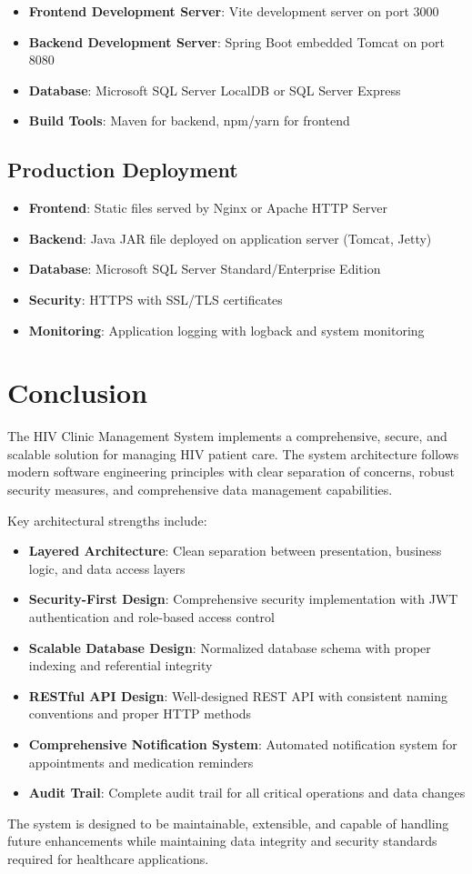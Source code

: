 \documentclass[12pt,a4paper]{article}
\begin{document}
\begin{itemize}
\item \textbf{Frontend Development Server}: Vite development server on port 3000
\item \textbf{Backend Development Server}: Spring Boot embedded Tomcat on port 8080
\item \textbf{Database}: Microsoft SQL Server LocalDB or SQL Server Express
\item \textbf{Build Tools}: Maven for backend, npm/yarn for frontend
\end{itemize}

\subsection{Production Deployment}

\begin{itemize}
\item \textbf{Frontend}: Static files served by Nginx or Apache HTTP Server
\item \textbf{Backend}: Java JAR file deployed on application server (Tomcat, Jetty)
\item \textbf{Database}: Microsoft SQL Server Standard/Enterprise Edition
\item \textbf{Security}: HTTPS with SSL/TLS certificates
\item \textbf{Monitoring}: Application logging with logback and system monitoring
\end{itemize}

\section{Conclusion}

The HIV Clinic Management System implements a comprehensive, secure, and scalable solution for managing HIV patient care. The system architecture follows modern software engineering principles with clear separation of concerns, robust security measures, and comprehensive data management capabilities.

Key architectural strengths include:
\begin{itemize}
\item \textbf{Layered Architecture}: Clean separation between presentation, business logic, and data access layers
\item \textbf{Security-First Design}: Comprehensive security implementation with JWT authentication and role-based access control
\item \textbf{Scalable Database Design}: Normalized database schema with proper indexing and referential integrity
\item \textbf{RESTful API Design}: Well-designed REST API with consistent naming conventions and proper HTTP methods
\item \textbf{Comprehensive Notification System}: Automated notification system for appointments and medication reminders
\item \textbf{Audit Trail}: Complete audit trail for all critical operations and data changes
\end{itemize}

The system is designed to be maintainable, extensible, and capable of handling future enhancements while maintaining data integrity and security standards required for healthcare applications.
\end{document}
